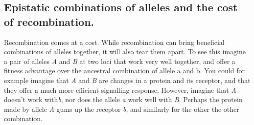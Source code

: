 \subsection{Epistatic combinations of alleles and the cost of recombination.}
Recombination comes at a cost. While recombination can bring beneficial combinations of alleles together, it will also tear them apart. To see this imagine a pair of alleles {\it A} and {\it B} at two loci that work very well together, and offer a fitness advantage over the ancestral combination of allele a and b. You could for example imagine that {\it A} and {\it B} are changes in a protein and its receptor, and that they offer a much more efficient signalling response. However, imagine that {\it A} doesn't work with{\it b}, nor does the allele {\it a} work well with {\it B}. Perhaps the protein made by allele {\it A} gums up the receptor {\it b}, and similarly for the other the other combination.


